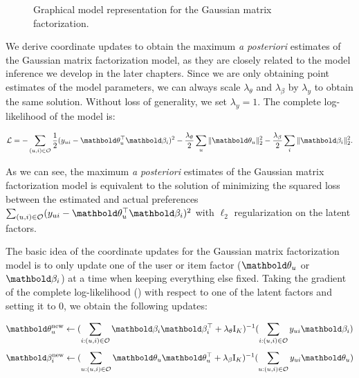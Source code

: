 \begin{figure}[ht]
  \centering
     
  \caption{Graphical model representation for the Gaussian matrix factorization.}
\label{chpt:background:fig:gmf}
\end{figure}

We derive coordinate updates to obtain the maximum \textit{a posteriori} estimates of the Gaussian matrix factorization model, as they are closely related to the model inference we develop in the later chapters. Since we are only obtaining point estimates of the model parameters, we can always scale $\lambda_\theta$ and $\lambda_\beta$ by $\lambda_y$ to obtain the same solution. Without loss of generality, we set $\lambda_y = 1$. The complete log-likelihood of the model is:

\begin{equation}
\cL = -\sum_{(u, i)\in \cO} \frac{1}{2}(y_{ui} - \mb\theta_u^\top\mb\beta_i)^2 - \frac{\lambda_\theta}{2} \sum_u \|\mb\theta_u \|^2_2 - \frac{\lambda_\beta}{2} \sum_i \|\mb\beta_i \|_2^2.
\label{chpt:background:eq:gmf_logll}
\end{equation}

As we can see, the maximum \emph{a posteriori} estimates of the Gaussian matrix factorization model is equivalent to the solution of minimizing the squared loss between the estimated and actual preferences $\sum_{(u, i)\in \mathcal{O}} (y_{ui} - \mb\theta_u^\top\mb\beta_i)^2$ with $\ell_2$ regularization on the latent factors.

The basic idea of the coordinate updates for the Gaussian matrix factorization model is to only update one of the user or item factor ($\mb\theta_u$ or $\mb\beta_i$) at a time when keeping everything else fixed. Taking the gradient of the complete log-likelihood () with respect to one of the latent factors and setting it to $0$, we obtain the following updates:

\begin{equation}
\mb\theta_u^\new \leftarrow (\sum_{i: (u, i) \in \cO} \mb\beta_i \mb\beta_i^\top + \lambda_\theta \mathrm{I}_K)^{-1} (\sum_{i: (u, i) \in \cO} y_{ui} \mb\beta_i)
\label{chpt:background:eq:als_user}
\end{equation}
\begin{equation}
\mb\beta_i^\new \leftarrow (\sum_{u: (u, i)\in\cO} \mb\theta_u \mb\theta_u^\top + \lambda_\beta \mathrm{I}_K)^{-1} (\sum_{u: (u, i)\in\cO} y_{ui} \mb\theta_u)
\label{chpt:background:eq:als_item}
\end{equation}

